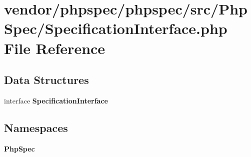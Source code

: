 \section{vendor/phpspec/phpspec/src/\+Php\+Spec/\+Specification\+Interface.php File Reference}
\label{_specification_interface_8php}
\subsection*{Data Structures}
\begin{DoxyCompactItemize}
\item 
interface {\bf Specification\+Interface}
\end{DoxyCompactItemize}
\subsection*{Namespaces}
\begin{DoxyCompactItemize}
\item 
 {\bf Php\+Spec}
\end{DoxyCompactItemize}
